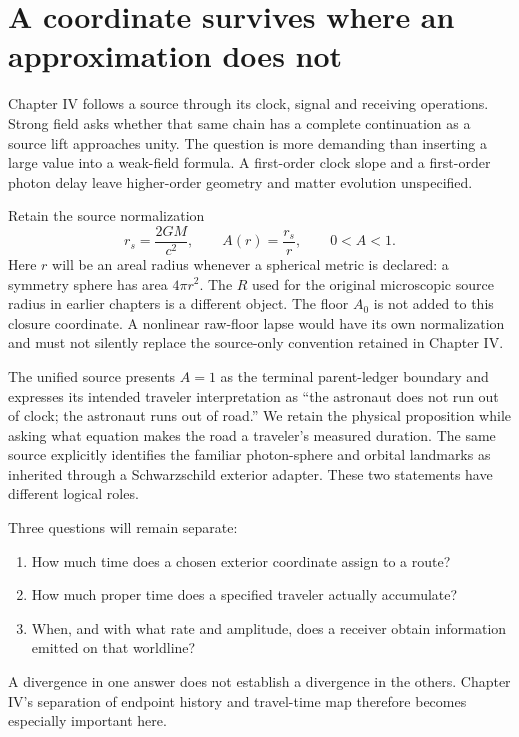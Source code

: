 \documentclass[10pt,twocolumn,letterpaper]{article}
\begin{document}
\section{A coordinate survives where an approximation does not}
Chapter IV follows a source through its clock, signal and receiving operations.\cite{chapiv} Strong field asks whether that same chain has a complete continuation as a source lift approaches unity. The question is more demanding than inserting a large value into a weak-field formula. A first-order clock slope and a first-order photon delay leave higher-order geometry and matter evolution unspecified.

Retain the source normalization
\begin{equation}
 r_s=\frac{2GM}{c^2},\qquad A(r)=\frac{r_s}{r},\qquad 0<A<1.
\end{equation}
Here $r$ will be an areal radius whenever a spherical metric is declared: a symmetry sphere has area $4\pi r^2$. The $R$ used for the original microscopic source radius in earlier chapters is a different object. The floor $A_0$ is not added to this closure coordinate. A nonlinear raw-floor lapse would have its own normalization and must not silently replace the source-only convention retained in Chapter IV.

The unified source presents $A=1$ as the terminal parent-ledger boundary and expresses its intended traveler interpretation as ``the astronaut does not run out of clock; the astronaut runs out of road.''\cite{unified} We retain the physical proposition while asking what equation makes the road a traveler's measured duration. The same source explicitly identifies the familiar photon-sphere and orbital landmarks as inherited through a Schwarzschild exterior adapter. These two statements have different logical roles.

Three questions will remain separate:
\begin{enumerate}[leftmargin=*,itemsep=2pt]
\item How much time does a chosen exterior coordinate assign to a route?
\item How much proper time does a specified traveler actually accumulate?
\item When, and with what rate and amplitude, does a receiver obtain information emitted on that worldline?
\end{enumerate}
A divergence in one answer does not establish a divergence in the others. Chapter IV's separation of endpoint history and travel-time map therefore becomes especially important here.
\end{document}
